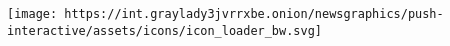 \texttt{[image: https://int.graylady3jvrrxbe.onion/newsgraphics/push-interactive/assets/icons/icon\_loader\_bw.svg]}
